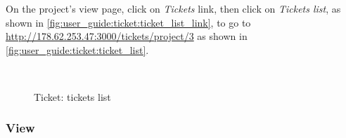 On the project's view page, click on \emph{Tickets} link, then click on \emph{Tickets list}, as shown in \autoref{fig:user_guide:ticket:ticket_list_link}, to go to \href{http://178.62.253.47:3000/tickets/project/3}{http://178.62.253.47:3000/tickets/project/3} as shown in \autoref{fig:user_guide:ticket:ticket_list}.

\begin{figure}[bth]
\myfloatalign
{} \quad
{} \\
\caption[Ticket: tickets list]{Ticket: tickets list}
\label{fig:user_guide:ticket:ticket_list}
\end{figure}

\clearpage

\subsubsection{View}
\label{ch:appendix-a:user_guide:ticket:list}

